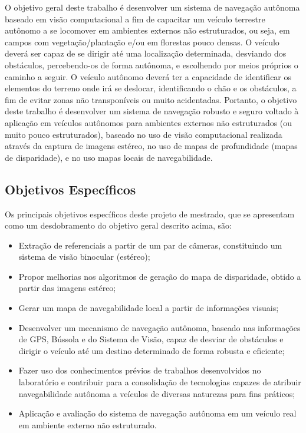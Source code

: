 \documentclass{article}
\begin{document}
O objetivo geral deste trabalho é desenvolver um sistema de navegação autônoma
baseado em visão computacional a fim de capacitar um veículo terrestre autônomo
a se locomover em ambientes externos não estruturados, ou seja, em campos com
vegetação/plantação e/ou em florestas pouco densas. O veículo deverá ser capaz
de se dirigir até uma localização determinada, desviando dos obstáculos,
percebendo-os de forma autônoma, e escolhendo por meios próprios o caminho a
seguir. O veículo autônomo deverá ter a capacidade de identificar os elementos
do terreno onde irá se deslocar, identificando o chão e os obstáculos, a fim de
evitar zonas não transponíveis ou muito acidentadas. Portanto, o objetivo deste
trabalho é desenvolver um sistema de navegação robusto e seguro voltado à
aplicação em veículos autônomos para ambientes externos não estruturados (ou
muito pouco estruturados), baseado no uso de visão computacional realizada
através da captura de imagens estéreo, no uso de mapas de profundidade (mapas de
disparidade), e no uso mapas locais de navegabilidade.

\subsection{Objetivos Específicos}

Os principais objetivos específicos deste projeto de mestrado, que se apresentam
como um desdobramento do objetivo geral descrito acima, são:

\begin{itemize}

\item Extração de referenciais a partir de um par de câmeras, constituindo um
sistema de visão binocular (estéreo);

\item Propor melhorias nos algoritmos de geração do mapa de disparidade, obtido
a partir das imagens estéreo;

\item Gerar um mapa de navegabilidade local a partir de informações visuais;

\item Desenvolver um mecanismo de navegação autônoma, baseado nas informações de
GPS, Bússola e do Sistema de Visão, capaz de desviar de obstáculos e dirigir o
veículo até um destino determinado de forma robusta e eficiente;

\item Fazer uso dos conhecimentos prévios de trabalhos desenvolvidos no
laboratório e contribuir para a consolidação de tecnologias capazes de atribuir
navegabilidade autônoma a veículos de diversas naturezas para fins práticos;

\item Aplicação e avaliação do sistema de navegação autônoma em um veículo real
em ambiente externo não estruturado.

\end{itemize}
\end{document}
